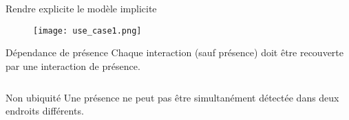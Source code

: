 \begin{frame}{Rendre explicite le modèle implicite}
  \begin{minipage}{0.3\linewidth}
      \begin{figure}
        \texttt{[image: use\_case1.png]}
      \end{figure}
    \end{minipage}
  \hfill
  \begin{minipage}{0.65\linewidth}
    \begin{coloredbox}[black]{Dépendance de présence}
      \footnotesize
      Chaque interaction (sauf présence) doit être recouverte par une interaction de présence.
      \small
      \begin{displaymath}
        \begin{array}{c}
        ~\\
        ~
        \end{array}
      \end{displaymath}
    \end{coloredbox}
    \begin{coloredbox}[black]{Non ubiquité}
      \footnotesize
      Une présence ne peut pas être simultanément détectée dans deux endroits différents.
      \small
      \begin{displaymath}
        \begin{array}{c}
         ~\\ 
         ~
        \end{array}
      \end{displaymath}
    \end{coloredbox}
  \end{minipage}
\end{frame}

